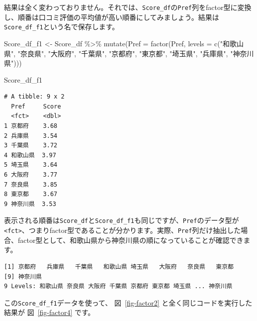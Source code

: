 \documentclass[
  a4paper,
  pandoc,
  ja=standard,
  jafont=haranoaji]{bxjsbook}
\newenvironment{Shaded}{\begin{snugshade}}{\end{snugshade}}
\newcommand{\AttributeTok}[1]{\textcolor[rgb]{0.00,0.48,0.65}{#1}}
\newcommand{\FunctionTok}[1]{\textcolor[rgb]{0.28,0.35,0.67}{#1}}
\newcommand{\NormalTok}[1]{\textcolor[rgb]{0.00,0.48,0.65}{#1}}
\newcommand{\OtherTok}[1]{\textcolor[rgb]{0.00,0.48,0.65}{#1}}
\newcommand{\SpecialCharTok}[1]{\textcolor[rgb]{0.37,0.37,0.37}{#1}}
\newcommand{\StringTok}[1]{\textcolor[rgb]{0.13,0.47,0.30}{#1}}
\begin{document}
結果は全く変わっておりません。それでは、\texttt{Score\_df}の\texttt{Pref}列をfactor型に変換し、順番は口コミ評価の平均値が高い順番にしてみましょう。結果は\texttt{Score\_df\_f1}という名で保存します。

\begin{Shaded}
\begin{Highlighting}[numbers=left,,]
\NormalTok{Score\_df\_f1 }\OtherTok{\textless{}{-}}\NormalTok{ Score\_df }\SpecialCharTok{\%\textgreater{}\%}
  \FunctionTok{mutate}\NormalTok{(}\AttributeTok{Pref =} \FunctionTok{factor}\NormalTok{(Pref, }\AttributeTok{levels =} \FunctionTok{c}\NormalTok{(}\StringTok{"和歌山県"}\NormalTok{, }\StringTok{"奈良県"}\NormalTok{, }\StringTok{"大阪府"}\NormalTok{,}
                                        \StringTok{"千葉県"}\NormalTok{, }\StringTok{"京都府"}\NormalTok{, }\StringTok{"東京都"}\NormalTok{,}
                                        \StringTok{"埼玉県"}\NormalTok{, }\StringTok{"兵庫県"}\NormalTok{, }\StringTok{"神奈川県"}\NormalTok{)))}

\NormalTok{Score\_df\_f1}
\end{Highlighting}
\end{Shaded}

\begin{verbatim}
# A tibble: 9 x 2
  Pref     Score
  <fct>    <dbl>
1 京都府    3.68
2 兵庫県    3.54
3 千葉県    3.72
4 和歌山県  3.97
5 埼玉県    3.64
6 大阪府    3.77
7 奈良県    3.85
8 東京都    3.67
9 神奈川県  3.53
\end{verbatim}

表示される順番は\texttt{Score\_df}と\texttt{Score\_df\_f1}も同じですが、\texttt{Pref}のデータ型が\texttt{\textless{}fct\textgreater{}}、つまりfactor型であることが分かります。実際、\texttt{Pref}列だけ抽出した場合、factor型として、和歌山県から神奈川県の順になっていることが確認できます。

\begin{Shaded}
\end{Shaded}

\begin{verbatim}
[1] 京都府   兵庫県   千葉県   和歌山県 埼玉県   大阪府   奈良県   東京都  
[9] 神奈川県
9 Levels: 和歌山県 奈良県 大阪府 千葉県 京都府 東京都 埼玉県 ... 神奈川県
\end{verbatim}

この\texttt{Score\_df\_f1}データを使って、 図~\ref{fig-factor2}
と全く同じコードを実行した結果が 図~\ref{fig-factor4} です。
\end{document}
